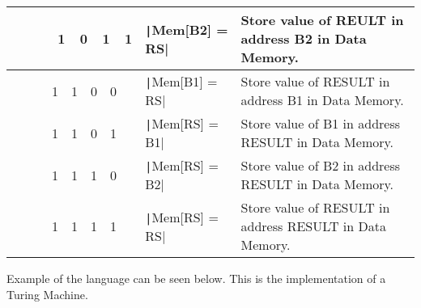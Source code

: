 \documentclass[12pt,journal,compsoc]{article}
\begin{document}
\begin{center}
{\begin{tabular}{ | p{5.5cm} | p{5.0cm} | m{12.0cm} | }
  ~~~~~~1~~0~~1~~1 & \texttt|Mem[B2] = RS| & Store value of REULT in address B2 in Data Memory. \\
  \hline
  ~~~~~~1~~1~~0~~0 & \texttt|Mem[B1] = RS| & Store value of RESULT in address B1 in Data Memory. \\
  \hline
  ~~~~~~1~~1~~0~~1 & \texttt|Mem[RS] = B1| & Store value of B1 in address RESULT in Data Memory. \\
  \hline
  ~~~~~~1~~1~~1~~0 & \texttt|Mem[RS] = B2| & Store value of B2 in address RESULT in Data Memory. \\
  \hline
  ~~~~~~1~~1~~1~~1 & \texttt|Mem[RS] = RS| & Store value of RESULT in address RESULT in Data Memory. \\
  \hline
\end{tabular} 
}

\end{center}

\clearpage
Example of the language can be seen below. This is the implementation of a Turing Machine.

\inputminted{python}{.docfiles/turing.hal}
\end{document}
